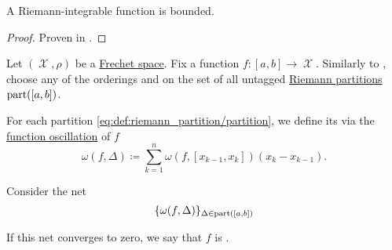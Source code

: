 \begin{corollary}\label{thm:riemann_integrable_implies_bounded}
  A Riemann-integrable function is bounded.
\end{corollary}
\begin{proof}
  Proven in .
\end{proof}

\begin{definition}\label{def:darboux_integrability}
  Let \( (\mscrX, \rho) \) be a \hyperref[def:frechet_space]{Frechet space}. Fix a function \( f: [a, b] \to \mscrX \). Similarly to , choose any of the orderings  and  on the set of all untagged \hyperref[def:riemann_partition/partition]{Riemann partitions} \( \operatorname{part}([a, b]) \).

  For each partition \eqref{eq:def:riemann_partition/partition}, we define its  via the \hyperref[def:function_oscillation]{function oscillation} of \( f \)
  \begin{equation}\label{eq:def:darboux_integrability/oscillation}
    \omega(f, \Delta) \coloneqq \sum_{k=1}^n \omega(f, [x_{k-1}, x_k]) (x_k - x_{k-1}).
  \end{equation}

  Consider the net
  \begin{equation}\label{eq:def:darboux_integrability/net}
    \{ \omega(f, \Delta) \}_{\Delta \in \operatorname{part}([a, b])}
  \end{equation}

  If this net converges to zero, we say that \( f \) is .
\end{definition}

